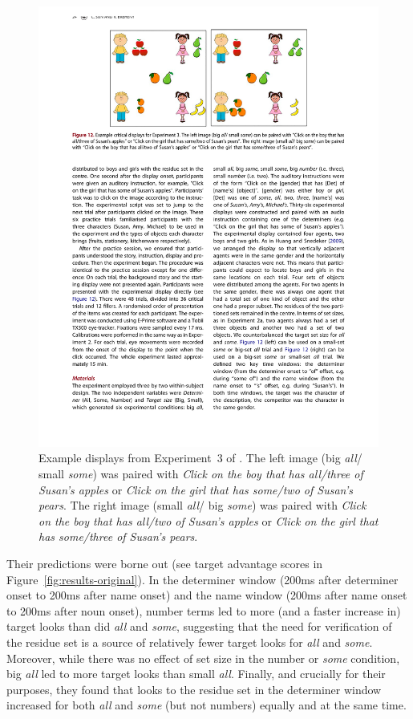 \documentclass[10pt,letterpaper]{article}
\newcommand{\figref}[1]{Figure~\ref{#1}}
\newcommand{\expref}[1]{Experiment~#1}
\begin{document}
\begin{figure}[H]
\centering
\includegraphics[width=\columnwidth]{images/display}
\caption{Example displays from \expref{3} of . The left image (big \emph{all}/ small  \emph{some}) was paired with  \emph{Click on the boy that has all/three of Susan's apples} or  \emph{Click on the girl that has some/two of Susan's pears}. The right image (small  \emph{all}/ big  \emph{some}) was paired with  \emph{Click on the boy that has all/two of Susan's apples} or  \emph{Click on the girl that has some/three of Susan's pears}.} 
\label{fig:display}
\end{figure}

Their predictions were borne out (see target advantage scores in  \figref{fig:results-original}). In the determiner window (200ms after determiner onset to 200ms after name onset) and the name window (200ms after name onset to 200ms after noun onset), number terms led to more (and a faster increase in) target looks than did \emph{all} and \emph{some}, suggesting that the need for verification of the residue set is a source of relatively fewer target looks for \emph{all} and \emph{some}. Moreover, while there was no effect of set size in the number or \emph{some} condition, big \emph{all} led to more target looks than small \emph{all}. Finally, and crucially for their purposes, they found that looks to the residue set in the determiner window increased for both \emph{all} and \emph{some} (but not numbers) equally and at the same time. 
\end{document}
